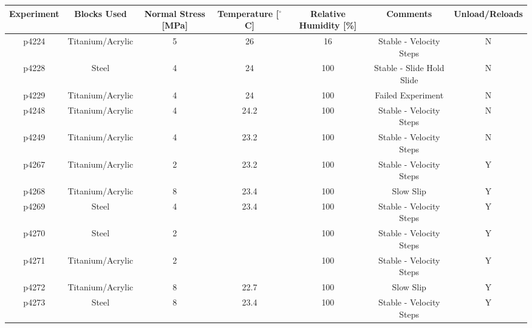 \documentclass[11pt]{article}
\begin{document}
\small
\begin{center}
\begin{table}
    \begin{tabular}{ | c c c c c c c | }
\hline
Experiment & Blocks Used & Normal Stress [MPa] & Temperature [$^\circ$C] & Relative Humidity [\%] & Comments & Unload/Reloads \\
\hline
p4224      & Titanium/Acrylic & 5                   & 26              & 16                    & Stable - Velocity Steps         & N              \\
p4228      & Steel            & 4                   & 24              & 100                   & Stable - Slide Hold Slide       & N              \\
p4229      & Titanium/Acrylic & 4                   & 24              & 100                   & Failed Experiment               & N              \\
p4248      & Titanium/Acrylic & 4                   & 24.2            & 100                   & Stable - Velocity Steps         & N              \\
p4249      & Titanium/Acrylic & 4                   & 23.2            & 100                   & Stable - Velocity Steps         & N              \\
p4267      & Titanium/Acrylic & 2                   & 23.2            & 100                   & Stable - Velocity Steps         & Y              \\
p4268      & Titanium/Acrylic & 8                   & 23.4            & 100                   & Slow Slip                       & Y              \\
p4269      & Steel            & 4                   & 23.4            & 100                   & Stable - Velocity Steps         & Y              \\
p4270      & Steel            & 2                   &                 & 100                   & Stable - Velocity Steps         & Y              \\
p4271      & Titanium/Acrylic & 2                   &                 & 100                   & Stable - Velocity Steps         & Y              \\
p4272      & Titanium/Acrylic & 8                   & 22.7            & 100                   & Slow Slip                       & Y              \\
p4273      & Steel            & 8                   & 23.4            & 100                   & Stable - Velocity Steps         & Y              \\

\end{tabular}
\end{table}
\end{center}
\end{document}
